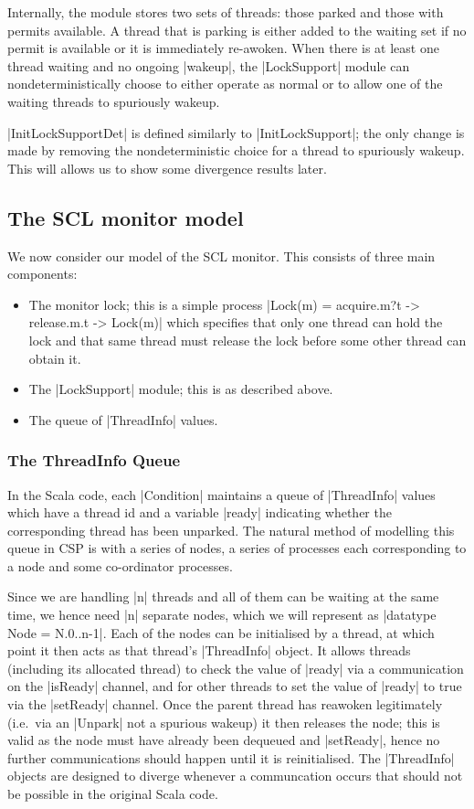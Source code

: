 Internally, the module stores two sets of threads: those parked and those with permits available. A thread that is parking is either added to the waiting set if no permit is available or it is immediately re-awoken. When there is at least one thread waiting and no ongoing |wakeup|, the |LockSupport| module can nondeterministically choose to either operate as normal or to allow one of the waiting threads to spuriously wakeup.

|InitLockSupportDet| is defined similarly to |InitLockSupport|; the only change is made by removing the nondeterministic choice for a thread to spuriously wakeup. This will allows us to show some divergence results later.

\subsection{The SCL monitor model}


We now consider our model of the SCL monitor. This consists of three main components:
\begin{itemize}
  \item The monitor lock; this is a simple process |Lock(m) = acquire.m?t -> release.m.t -> Lock(m)| which specifies that only one thread can hold the lock and that same thread must release the lock before some other thread can obtain it.
  \item The |LockSupport| module; this is as described above.
  \item The queue of |ThreadInfo| values.
\end{itemize}

\subsubsection{The ThreadInfo Queue}

In the Scala code, each |Condition| maintains a queue of |ThreadInfo| values which have a thread id and a variable |ready| indicating whether the corresponding thread has been unparked. The natural method of modelling this queue in CSP is with a series of nodes, a series of processes each corresponding to a node and some co-ordinator processes.

Since we are handling |n| threads and all of them can be waiting at the same time, we hence need |n| separate nodes, which we will represent as |datatype Node = N.{0..n-1}|. Each of the nodes can be initialised by a thread, at which point it then acts as that thread's |ThreadInfo| object. It allows threads (including its allocated thread) to check the value of |ready| via a communication on the |isReady| channel, and for other threads to set the value of |ready| to true via the |setReady| channel. Once the parent thread has reawoken legitimately (i.e.~via an |Unpark| not a spurious wakeup) it then releases the node; this is valid as the node must have already been dequeued and |setReady|, hence no further communications should happen until it is reinitialised. The |ThreadInfo| objects are designed to diverge whenever a communcation occurs that should not be possible in the original Scala code.

